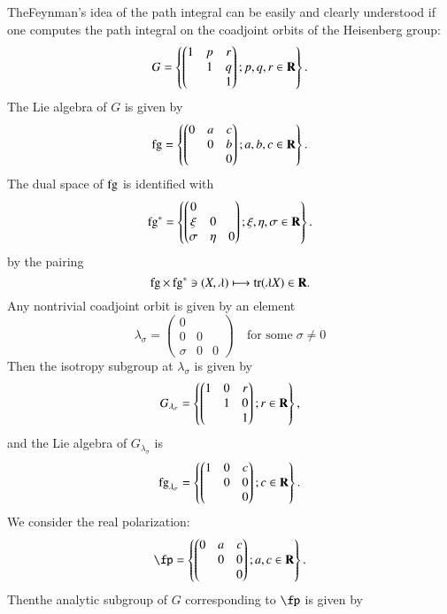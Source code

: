 The\pageoriginale Feynman's idea of the path integral can be easily and clearly understood if one computes the path integral on the coadjoint orbits of the Heisenberg group:
$$
G= \left\{ \begin{pmatrix}
1 & p & r\\
  &  1 & q\\
  &    & 1
\end{pmatrix}
; p,q,r \in \mathbf{R} \right\}.
$$
The Lie algebra of $G$ is given by
$$
\operatorname{fg} = \left\{ \begin{pmatrix}
0 & a & c\\
  &  0 & b\\
  &    & 0
\end{pmatrix}
; a,b,c \in \mathbf{R} \right\}.
$$
The dual space of $\operatorname{fg}$ is identified with
$$
\operatorname{fg}^{*} = \left\{ \begin{pmatrix}
0 &  & \\
 \xi &  0 & \\
 \sigma & \eta   & 0
\end{pmatrix}
; \xi,\eta, \sigma \in \mathbf{R} \right\}.
$$
by the pairing
$$
\operatorname{fg} \times \operatorname{fg}^{*} \ni (X, \lambda) \longmapsto {\rm tr}(\lambda X) \in \mathbf{R}.
$$
Any nontrivial coadjoint orbit is given by an element
$$
\lambda_{\sigma} = \begin{pmatrix}
0 &  &  \\
 0 &  0 & \\
 \sigma & 0  & 0
\end{pmatrix}
\quad \text{for some} \; \sigma \neq 0
$$
Then the isotropy subgroup at $\lambda_{\sigma}$ is given by
$$
G_{\lambda_{\sigma}} = \left\{ \begin{pmatrix}
1 & 0 & r \\
  &  1 & 0\\
  &    & 1
\end{pmatrix}
; r \in \mathbf{R} \right\},
$$
and the Lie algebra of $G_{\lambda_{\sigma}}$ is
$$
\operatorname{fg}_{\lambda_{\sigma}}= \left\{ \begin{pmatrix}
1 & 0 & c \\
  &  0 & 0\\
  &    & 0
\end{pmatrix}
; c \in \mathbf{R} \right\}.
$$
We consider the real polarization:
$$
\fp= \left\{ \begin{pmatrix}
0 & a & c \\
  &  0 & 0\\
  &    & 0
\end{pmatrix}
; a, c \in \bR \right\}.
$$
Then\pageoriginale the analytic subgroup of $G$ corresponding to $\fp$ is given by
